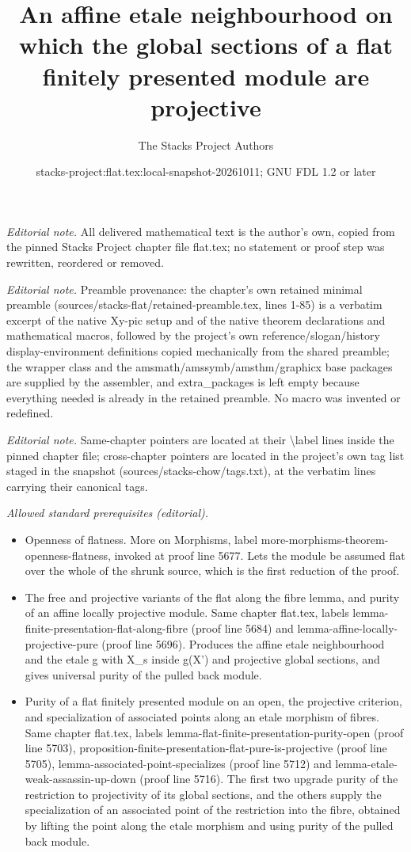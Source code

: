 \documentclass[10pt,a4paper]{amsart}
\title{An affine etale neighbourhood on which the global sections of a flat finitely presented module are projective}
\author{The Stacks Project Authors}
\date{stacks-project:flat.tex:local-snapshot-20261011; GNU FDL 1.2 or later}
\theoremstyle{plain}
\theoremstyle{definition}
\theoremstyle{remark}
\numberwithin{equation}{subsection}
\begin{document}
\maketitle
\noindent\textit{Editorial note.} All delivered mathematical text is the author's own, copied from the pinned Stacks Project chapter file flat.tex; no statement or proof step was rewritten, reordered or removed.\par\medskip
\noindent\textit{Editorial note.} Preamble provenance: the chapter's own retained minimal preamble (sources/stacks-flat/retained-preamble.tex, lines 1-85) is a verbatim excerpt of the native Xy-pic setup and of the native theorem declarations and mathematical macros, followed by the project's own reference/slogan/history display-environment definitions copied mechanically from the shared preamble; the wrapper class and the amsmath/amssymb/amsthm/graphicx base packages are supplied by the assembler, and extra\_packages is left empty because everything needed is already in the retained preamble. No macro was invented or redefined.\par\medskip
\noindent\textit{Editorial note.} Same-chapter pointers are located at their \textbackslash{}label lines inside the pinned chapter file; cross-chapter pointers are located in the project's own tag list staged in the snapshot (sources/stacks-chow/tags.txt), at the verbatim lines carrying their canonical tags.\par\medskip
\noindent\textit{Allowed standard prerequisites (editorial).}\begin{itemize}
\item Openness of flatness. More on Morphisms, label more-morphisms-theorem-openness-flatness, invoked at proof line 5677. Lets the module be assumed flat over the whole of the shrunk source, which is the first reduction of the proof.
\item The free and projective variants of the flat along the fibre lemma, and purity of an affine locally projective module. Same chapter flat.tex, labels lemma-finite-presentation-flat-along-fibre (proof line 5684) and lemma-affine-locally-projective-pure (proof line 5696). Produces the affine etale neighbourhood and the etale g with X\_s inside g(X') and projective global sections, and gives universal purity of the pulled back module.
\item Purity of a flat finitely presented module on an open, the projective criterion, and specialization of associated points along an etale morphism of fibres. Same chapter flat.tex, labels lemma-flat-finite-presentation-purity-open (proof line 5703), proposition-finite-presentation-flat-pure-is-projective (proof line 5705), lemma-associated-point-specializes (proof line 5712) and lemma-etale-weak-assassin-up-down (proof line 5716). The first two upgrade purity of the restriction to projectivity of its global sections, and the others supply the specialization of an associated point of the restriction into the fibre, obtained by lifting the point along the etale morphism and using purity of the pulled back module.
\end{itemize}\medskip
\end{document}
